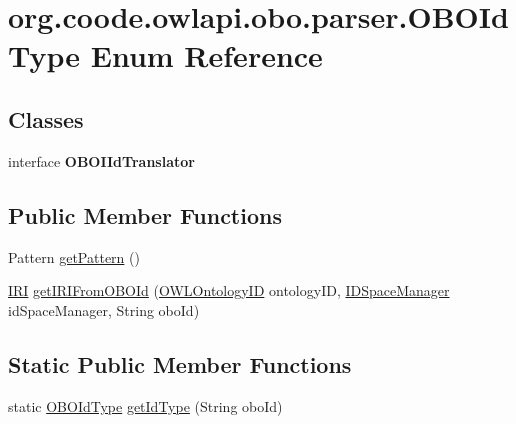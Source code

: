 \hypertarget{enumorg_1_1coode_1_1owlapi_1_1obo_1_1parser_1_1_o_b_o_id_type}{\section{org.\-coode.\-owlapi.\-obo.\-parser.\-O\-B\-O\-Id\-Type Enum Reference}
\label{enumorg_1_1coode_1_1owlapi_1_1obo_1_1parser_1_1_o_b_o_id_type}
}
\subsection*{Classes}
\begin{DoxyCompactItemize}
\item 
interface {\bfseries O\-B\-O\-I\-Id\-Translator}
\end{DoxyCompactItemize}
\subsection*{Public Member Functions}
\begin{DoxyCompactItemize}
\item 
Pattern \hyperlink{enumorg_1_1coode_1_1owlapi_1_1obo_1_1parser_1_1_o_b_o_id_type_aea81341672491809d7d7fe8311d12c93}{get\-Pattern} ()
\item 
\hyperlink{classorg_1_1semanticweb_1_1owlapi_1_1model_1_1_i_r_i}{I\-R\-I} \hyperlink{enumorg_1_1coode_1_1owlapi_1_1obo_1_1parser_1_1_o_b_o_id_type_a20861c514a5d45763ad0e6da65cd04c0}{get\-I\-R\-I\-From\-O\-B\-O\-Id} (\hyperlink{classorg_1_1semanticweb_1_1owlapi_1_1model_1_1_o_w_l_ontology_i_d}{O\-W\-L\-Ontology\-I\-D} ontology\-I\-D, \hyperlink{classorg_1_1coode_1_1owlapi_1_1obo_1_1parser_1_1_i_d_space_manager}{I\-D\-Space\-Manager} id\-Space\-Manager, String obo\-Id)
\end{DoxyCompactItemize}
\subsection*{Static Public Member Functions}
\begin{DoxyCompactItemize}
\item 
static \hyperlink{enumorg_1_1coode_1_1owlapi_1_1obo_1_1parser_1_1_o_b_o_id_type}{O\-B\-O\-Id\-Type} \hyperlink{enumorg_1_1coode_1_1owlapi_1_1obo_1_1parser_1_1_o_b_o_id_type_af0b1eace3e70d4f72fc4e03f5b2c00eb}{get\-Id\-Type} (String obo\-Id)
\end{DoxyCompactItemize}
